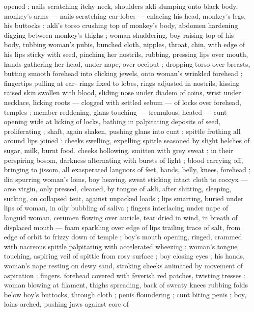opened ; nails scratching itchy neck, shoulders {\col} akli slumping onto 
black body, monkey's arms --- nails scratching ear-lobes --- enlacing 
his head, monkey's legs, his buttocks ; akli's torso crushing top of 
monkey's body, abdomen hardening digging between monkey's 
thighs ; woman shuddering, boy raising top of his body, tubbing 
woman's pubis, bunched cloth, nipples, throat, chin, with edge of his 
lips sticky with seed, pinching her nostrils, rubbing, pressing lips 
over mouth, hands gathering her head, under nape, over occiput ; 
dropping torso over breasts, butting smooth forehead into clicking 
jewels, onto woman's wrinkled forehead ; fingertips pulling at ear- 
rings fixed to lobes, rings adjusted in nostrils, kissing raised skin 
swollen with blood, sliding nose under diadem of coins, wrist under 
necklace, licking roots --- clogged with settled sebum --- of locks 
over forehead, temples ; member reddening, glans touching --- 
tremulous, heated --- cunt opening wide at licking of locks, bathing 
in palpitating deposits of seed, proliferating ; shaft, again shaken, 
pushing glans into cunt ; spittle frothing all around lips joined : 
cheeks swelling, expelling spittle seasoned by slight belches of 
sugar, milk, burnt food, cheeks hollowing, smitten with grey sweat ; 
in their perspiring bosom, darkness alternating with bursts of light ; 
blood carrying off, bringing to jissom, all exasperated languors of 
feet, hands, belly, knees, forehead ; ilia spurring woman's loins, boy 
heaving, sweat sticking intact cloth to coccyx --- arse virgin, only 
pressed, cleaned, by tongue of akli, after shitting, sleeping, sucking, 
on collapsed tent, against unpacked loads ; lips smarting, buried 
under lips of woman, in oily bubbling of saliva ; fingers interlacing 
under nape of languid woman, cerumen flowing over auricle, tear 
dried in wind, in breath of displaced mouth --- foam sparkling over 
edge of lips {\dashcom} trailing trace of salt, from edge of orbit to frizzy 
down of temple ; boy's mouth opening, ringed, crammed with 
nacreous spittle palpitating with accelerated wheezing ; woman's 
tongue touching, aspiring veil of spittle from rosy surface ; boy 
closing eyes ; his hands, woman's nape resting on dewy sand, 
stroking cheeks animated by movement of aspiration ; fingers. 
forehead covered with feverish red patches, twisting tresses ; woman 
blowing at filament, thighs spreading, back of sweaty knees rubbing 
folds below boy's buttocks, through cloth ; penis floundering ; cunt 
biting penis ; boy, loins arched, pushing jaws against core of 
